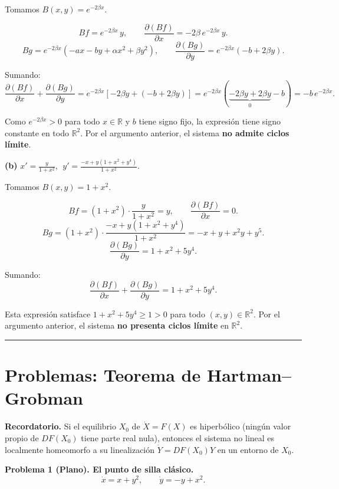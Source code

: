 \documentclass[12pt,letterpaper]{article}
\begin{document}
Tomamos $B(x,y)=e^{-2\beta x}$.

\[
  Bf = e^{-2\beta x}\,y, \qquad
  \frac{\partial(Bf)}{\partial x} = -2\beta\,e^{-2\beta x}\,y.
\]
\[
  Bg = e^{-2\beta x}\!\left(-ax-by+\alpha x^2+\beta y^2\right), \qquad
  \frac{\partial(Bg)}{\partial y} = e^{-2\beta x}(-b+2\beta y).
\]

Sumando:
\[
  \frac{\partial(Bf)}{\partial x}+\frac{\partial(Bg)}{\partial y}
  = e^{-2\beta x}\!\left[-2\beta y + (-b+2\beta y)\right]
  = e^{-2\beta x}(\underbrace{-2\beta y+2\beta y}_{0}-b)
  = \boxed{-b\,e^{-2\beta x}.}
\]

Como $e^{-2\beta x}>0$ para todo $x\in\mathbb{R}$ y $b$ tiene signo fijo, la expresión tiene
signo constante en todo $\mathbb{R}^2$. Por el argumento anterior, el sistema
\textbf{no admite ciclos límite}.

\bigskip
\noindent\textbf{(b)} $\displaystyle x'=\frac{y}{1+x^2}$, $\;\displaystyle y'=\frac{-x+y(1+x^2+y^4)}{1+x^2}$.

Tomamos $B(x,y)=1+x^2$.

\[
  Bf = (1+x^2)\cdot\frac{y}{1+x^2} = y, \qquad
  \frac{\partial(Bf)}{\partial x} = 0.
\]
\[
  Bg = (1+x^2)\cdot\frac{-x+y(1+x^2+y^4)}{1+x^2}
     = -x+y+x^2y+y^5.
\]
\[
  \frac{\partial(Bg)}{\partial y} = 1+x^2+5y^4.
\]

Sumando:
\[
  \frac{\partial(Bf)}{\partial x}+\frac{\partial(Bg)}{\partial y}
  = \boxed{1+x^2+5y^4.}
\]

Esta expresión satisface $1+x^2+5y^4 \geq 1>0$ para todo $(x,y)\in\mathbb{R}^2$. Por el argumento anterior, el sistema \textbf{no presenta ciclos límite} en $\mathbb{R}^2$.

\bigskip
\noindent\rule{\textwidth}{0.3pt}
\bigskip

\section*{Problemas: Teorema de Hartman--Grobman}

\noindent\textbf{Recordatorio.} Si el equilibrio $X_0$ de $\dot X=F(X)$ es hiperbólico
(ningún valor propio de $DF(X_0)$ tiene parte real nula), entonces el sistema no lineal es
localmente homeomorfo a su linealización $\dot Y=DF(X_0)Y$ en un entorno de $X_0$.

\bigskip
\noindent\textbf{Problema 1 (Plano). El punto de silla clásico.}
\[
  \dot x = x+y^2, \qquad \dot y = -y+x^2.
\]
\end{document}
